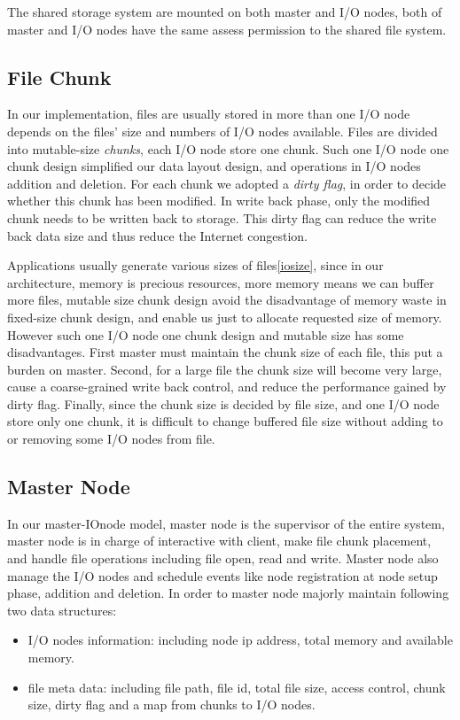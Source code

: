 The shared storage system are mounted on both master and I/O nodes, both of master and I/O nodes have the same assess permission to the shared file system.

\subsection{File Chunk}
In our implementation, files are usually stored in more than one I/O node depends on the files' size and numbers of I/O nodes available.
Files are divided into mutable-size \emph{chunks}, each I/O node store one chunk.
Such one I/O node one chunk design simplified our data layout design, and operations in I/O nodes addition and deletion.
For each chunk we adopted a \emph{dirty flag}, in order to decide whether this chunk has been modified.
In write back phase, only the modified chunk needs to be written back to storage.
This dirty flag can reduce the write back data size and thus reduce the Internet congestion.

Applications usually generate various sizes of files\ref{iosize}, since in our architecture, memory is precious resources, more memory means we can buffer more files,
mutable size chunk design avoid the disadvantage of memory waste in fixed-size chunk design, and enable us just to allocate requested size of memory.
However such one I/O node one chunk design and mutable size has some disadvantages. First master must maintain the chunk size of each file, this put a burden on master.
Second, for a large file the chunk size will become very large, cause a coarse-grained write back control, and reduce the performance gained by dirty flag.
Finally, since the chunk size is decided by file size, and one I/O node store only one chunk, it is difficult to change buffered file size without adding to or removing some I/O nodes from file.

\subsection{Master Node}
In our master-IOnode model, master node is the supervisor of the entire system,
master node is in charge of interactive with client, make file chunk placement, and handle file operations including file open, read and write.
Master node also manage the I/O nodes and schedule events like node registration at node setup phase, addition and deletion.
In order to master node majorly maintain following two data structures:
\begin{itemize}
  \item I/O nodes information: including node ip address, total memory and available memory.
  \item file meta data: including file path, file id, total file size, access control, chunk size, dirty flag and a map from chunks to I/O nodes.
\end{itemize}

